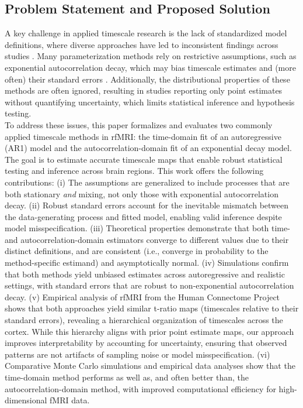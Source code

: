 \documentclass[docs/main.tex]{subfiles}
\begin{document}
\subsection{Problem Statement and Proposed Solution}
A key challenge in applied timescale research is the lack of standardized model definitions, where diverse approaches have led to inconsistent findings across studies \citep{zeraati_flexible_2022, fallon_timescales_2020, shafiei_topographic_2020}. Many parameterization methods rely on restrictive assumptions, such as exponential autocorrelation decay, which may bias timescale estimates and (more often) their standard errors \citep{woolrich_temporal_2001, zeraati_flexible_2022, raut_time_2019}. Additionally, the distributional properties of these methods are often ignored, resulting in studies reporting only point estimates without quantifying uncertainty, which limits statistical inference and hypothesis testing.\\

To address these issues, this paper formalizes and evaluates two commonly applied timescale methods in rfMRI: the time-domain fit of an autoregressive (AR1) model and the autocorrelation-domain fit of an exponential decay model. The goal is to estimate accurate timescale maps that enable robust statistical testing and inference across brain regions. This work offers the following contributions: (i) The assumptions are generalized to include processes that are both stationary \emph{and} mixing, not only those with exponential autocorrelation decay. (ii) Robust standard errors account for the inevitable mismatch between the data-generating process and fitted model, enabling valid inference despite model misspecification. (iii) Theoretical properties demonstrate that both time- and autocorrelation-domain estimators converge to different values due to their distinct definitions, and are consistent (i.e., converge in probability to the method-specific estimand) and asymptotically normal. (iv) Simulations confirm that both methods yield unbiased estimates across autoregressive and realistic settings, with standard errors that are robust to non-exponential autocorrelation decay. (v) Empirical analysis of rfMRI from the Human Connectome Project shows that both approaches yield similar t-ratio maps (timescales relative to their standard errors), revealing a hierarchical organization of timescales across the cortex. While this hierarchy aligns with prior point estimate maps, our approach improves interpretability by accounting for uncertainty, ensuring that observed patterns are not artifacts of sampling noise or model misspecification. (vi) Comparative Monte Carlo simulations and empirical data analyses show that the time-domain method performs as well as, and often better than, the autocorrelation-domain method, with improved computational efficiency for high-dimensional fMRI data.\\
\end{document}
